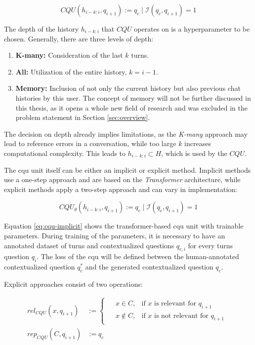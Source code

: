\begin{equation}
    CQU(h_{i-k:i}, q_{i+1}) := q_c \mid \mathcal{I}(q_c, q_{i+1}) = 1
\end{equation}

The depth of the history $h_{i-k:i}$ that $CQU$ operates on is a hyperparameter to be chosen. Generally, there are three levels of depth:

\begin{enumerate}
    \item \textbf{K-many:} Consideration of the last $k$ turns.
    \item \textbf{All:} Utilization of the entire history, $k = i - 1$.
    \item \textbf{Memory:} Inclusion of not only the current history but also previous chat histories by this user. The concept of memory will not be further discussed in this thesis, as it opens a whole new field of research and was excluded in the problem statement in Section \ref{sec:overview}.
\end{enumerate}

The decision on depth already implies limitations, as the \textit{K-many} approach may lead to reference errors in a conversation, while too large $k$ increases computational complexity. This leads to $h_{i-k:i} \subset H$, which is used by the $CQU$.

The \gls{cqu} unit itself can be either an implicit or explicit method. Implicit methods use a one-step approach and are based on the \textit{Transformer} architecture, while explicit methods apply a two-step approach and can vary in implementation:

\begin{equation}
    CQU_{\theta}(h_{i-k:i}, q_{i+1}) := q_c \mid \mathcal{I}(q_c, q_{i+1}) = 1 
    \label{eq:cqu-implicit} 
\end{equation}

Equation \ref{eq:cqu-implicit} shows the transformer-based \gls{cqu} unit with trainable parameters. During training of the parameters, it is necessary to have an annotated dataset of turns and contextualized questions $q_{c,i}$ for every turns question $q_i$. The loss of the \gls{cqu} will be defined between the human-annotated contextualized question $q_c^*$ and the generated contextualized question $q_c$.

Explicit approaches consist of two operations:

\begin{align}
    rel_{CQU}(x, q_{i+1}) &:= 
    \begin{cases}
        \begin{aligned}
            & x \in C, & \text{if } x \text{ is relevant for } q_{i+1}\\
            & x \not\in C, & \text{if }  x \text{ is not relevant for } q_{i+1}
        \end{aligned}
    \end{cases} \\
    rep_{CQU}(C, q_{i+1}) &:= q_c
\end{align}

